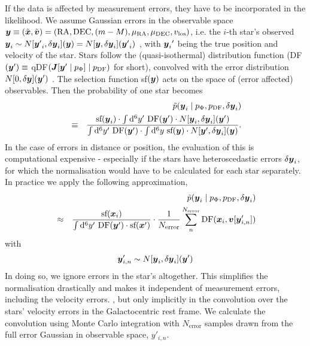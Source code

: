 
If the data is affected by measurement errors, they have to be incorporated in the likelihood. We assume Gaussian errors in the observable space $\boldsymbol{y} \equiv (\tilde{\boldsymbol{x}},\tilde{\boldsymbol{v}})=(\text{RA},\text{DEC},(m-M),\mu_\text{RA},\mu_\text{DEC},v_\text{los})$, i.e. the $i$-th star's observed $\boldsymbol{y}_i \sim N[{\boldsymbol{y}'}_i,\delta \boldsymbol{y}_i](\boldsymbol{y}) = N[\boldsymbol{y},\delta \boldsymbol{y}_i]({\boldsymbol{y}'}_i)$ , with ${\boldsymbol{y}_i}'$ being the true position and velocity of the star. Stars follow the (quasi-isothermal) distribution function (DF$(\boldsymbol{y}') \equiv$ qDF$(\boldsymbol{J}[\boldsymbol{y}' \mid p_\Phi] \mid p_\text{DF})$ for short), convolved with the error distribution $N[0,\delta \boldsymbol{y}](\boldsymbol{y}')$ . The selection function sf$(\boldsymbol{y})$ acts on the space of (error affected) observables. 
Then the probability of one star becomes
\begin{eqnarray*}
&&\tilde{p}(\boldsymbol{y}_i \mid p_\Phi,p_\text{DF},\delta \boldsymbol{y}_i)\\
& \equiv& \frac{\text{sf}(\boldsymbol{y}_i) \cdot \int \mathop{}\!\mathrm{d^6} y' \  \text{DF}(\boldsymbol{y}') \cdot N[\boldsymbol{y}_i,\delta \boldsymbol{y}_i](\boldsymbol{y}')}{\int \mathop{}\!\mathrm{d^6}y'  \  \text{DF}(\boldsymbol{y}')  \cdot  \int \mathop{}\!\mathrm{d^6} y \  \text{sf}(\boldsymbol{y})  \cdot N[\boldsymbol{y}',\delta \boldsymbol{y}_i](\boldsymbol{y})}.
\end{eqnarray*}
In the case of errors in distance or position, the evaluation of this is computational expensive - especially if the stars have heteroscedastic errors $\delta \boldsymbol{y}_i$, for which the normalisation would have to be calculated for each star separately. In practice we apply the following approximation,
\begin{eqnarray}
&&\tilde{p}(\boldsymbol{y}_i \mid p_\Phi,p_\text{DF},\delta \boldsymbol{y}_i) \nonumber\\
&\approx& \frac{ \text{sf}(\boldsymbol{x}_i)}{\int \mathop{}\!\mathrm{d^6}y'  \  \text{DF}(\boldsymbol{y}')  \cdot   \text{sf}(\boldsymbol{x}')} \cdot \frac{1}{N_\text{error}} \sum_n^{N_\text{error}}  \text{DF}(\boldsymbol{x}_i,\boldsymbol{v}[\boldsymbol{y}'_{i,n}]) \label{eq:errorconv}
\end{eqnarray}
with
\begin{eqnarray}
\boldsymbol{y}'_{i,n} \sim N[\boldsymbol{y}_i,\delta \boldsymbol{y}_i](\boldsymbol{y}')\nonumber
\end{eqnarray}
In doing so, we ignore errors in the star's  altogether. This simplifies the normalisation drastically and makes it independent of measurement errors, including the velocity errors. , but only implicitly in the convolution over the stars' velocity errors in the Galactocentric rest frame. We calculate the convolution using Monte Carlo integration with $N_\text{error}$ samples drawn from the full error Gaussian in observable space, $y'_{i,n}$. \\
